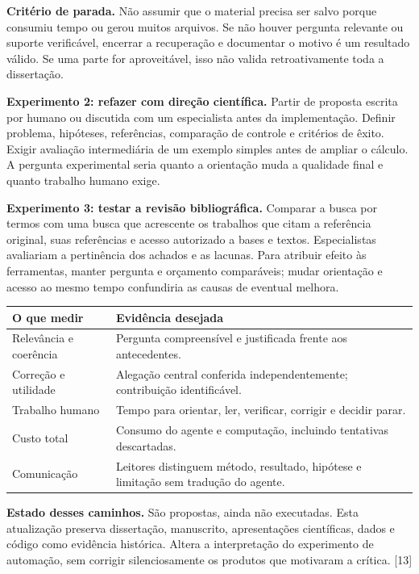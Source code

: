 \documentclass[11pt,a4paper]{article}
\newcommand{\fonte}[1]{{\small\color{navy}[#1]}}
\begin{document}
\textbf{Critério de parada.} Não assumir que o material precisa ser salvo porque consumiu tempo ou gerou muitos arquivos. Se não houver pergunta relevante ou suporte verificável, encerrar a recuperação e documentar o motivo é um resultado válido. Se uma parte for aproveitável, isso não valida retroativamente toda a dissertação.

\textbf{Experimento 2: refazer com direção científica.} Partir de proposta escrita por humano ou discutida com um especialista antes da implementação. Definir problema, hipóteses, referências, comparação de controle e critérios de êxito. Exigir avaliação intermediária de um exemplo simples antes de ampliar o cálculo. A pergunta experimental seria quanto a orientação muda a qualidade final e quanto trabalho humano exige.

\textbf{Experimento 3: testar a revisão bibliográfica.} Comparar a busca por termos com uma busca que acrescente os trabalhos que citam a referência original, suas referências e acesso autorizado a bases e textos. Especialistas avaliariam a pertinência dos achados e as lacunas. Para atribuir efeito às ferramentas, manter pergunta e orçamento comparáveis; mudar orientação e acesso ao mesmo tempo confundiria as causas de eventual melhora.

\begin{tabularx}{\textwidth}{@{}Y Y@{}}
\toprule
\textbf{O que medir} & \textbf{Evidência desejada}\\
\midrule
Relevância e coerência & Pergunta compreensível e justificada frente aos antecedentes.\\
Correção e utilidade & Alegação central conferida independentemente; contribuição identificável.\\
Trabalho humano & Tempo para orientar, ler, verificar, corrigir e decidir parar.\\
Custo total & Consumo do agente e computação, incluindo tentativas descartadas.\\
Comunicação & Leitores distinguem método, resultado, hipótese e limitação sem tradução do agente.\\
\bottomrule
\end{tabularx}

\textbf{Estado desses caminhos.} São propostas, ainda não executadas. Esta atualização preserva dissertação, manuscrito, apresentações científicas, dados e código como evidência histórica. Altera a interpretação do experimento de automação, sem corrigir silenciosamente os produtos que motivaram a crítica. \fonte{13}
\newpage
\end{document}
